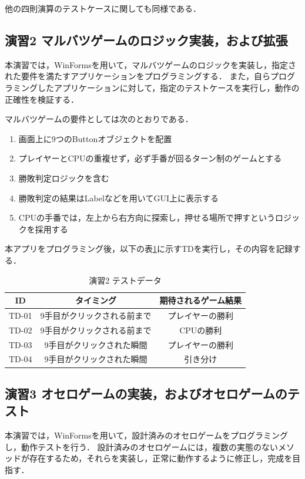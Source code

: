 \documentclass[platex,dvipdfmx,12pt]{jsarticle}
\begin{document}
他の四則演算のテストケースに関しても同様である．


\subsection{演習2 マルバツゲームのロジック実装，および拡張}
本演習では，WinFormsを用いて，マルバツゲームのロジックを実装し，指定された要件を満たすアプリケーションをプログラミングする．
また，自らプログラミングしたアプリケーションに対して，指定のテストケースを実行し，動作の正確性を検証する．

マルバツゲームの要件としては次のとおりである．

\begin{enumerate}
  \item 画面上に9つのButtonオブジェクトを配置
  \item プレイヤーとCPUの重複せず，必ず手番が回るターン制のゲームとする
  \item 勝敗判定ロジックを含む
  \item 勝敗判定の結果はLabelなどを用いてGUI上に表示する
  \item CPUの手番では，左上から右方向に探索し，押せる場所で押すというロジックを採用する
\end{enumerate}

本アプリをプログラミング後，以下の表\ref{tab:enshu2-tds}に示すTDを実行し，その内容を記録する．

\begin{table}[H]
  \centering
  \caption{演習2 テストデータ}
  \label{tab:enshu2-tds}
  \begin{tabular}{ccc}
    ID & タイミング & 期待されるゲーム結果 \\
    \hline
    TD-01 & 9手目がクリックされる前まで & プレイヤーの勝利 \\ 
    TD-02 & 9手目がクリックされる前まで & CPUの勝利 \\
    TD-03 & 9手目がクリックされた瞬間 & プレイヤーの勝利 \\
    TD-04 & 9手目がクリックされた瞬間 & 引き分け \\
  \end{tabular}
\end{table}


\subsection{演習3 オセロゲームの実装，およびオセロゲームのテスト}
本演習では，WinFormsを用いて，設計済みのオセロゲームをプログラミングし，動作テストを行う．
設計済みのオセロゲームには，複数の実態のないメソッドが存在するため，それらを実装し，正常に動作するように修正し，完成を目指す．
\end{document}
